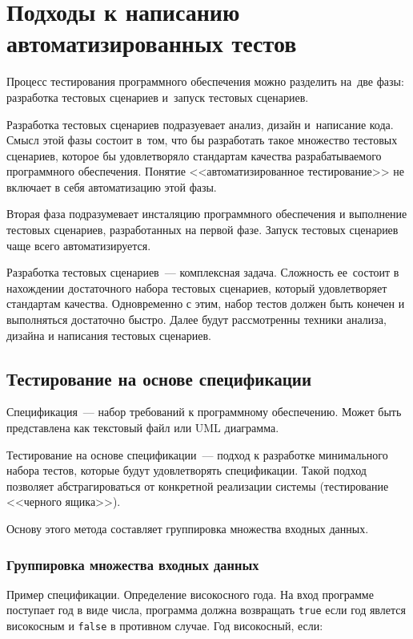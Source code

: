 \section{Подходы к написанию автоматизированных тестов} 

Процесс тестирования программного обеспечения можно разделить на~две фазы: разработка тестовых сценариев и~запуск тестовых сценариев. 

Разработка тестовых сценариев подразуевает анализ, дизайн и~написание кода. Смысл этой фазы состоит в~том, что бы разработать такое множество тестовых сценариев, которое бы удовлетворяло стандартам качества разрабатываемого программного обеспечения. Понятие <<автоматизированное тестирование>> не включает в себя автоматизацию этой фазы.

Вторая фаза подразумевает инсталяцию программного обеспечения и выполнение тестовых сценариев, разработанных на первой фазе. Запуск тестовых сценариев чаще всего автоматизируется. 


Разработка тестовых сценариев~--- комплексная задача. Сложность ее~состоит в нахождении достаточного набора тестовых сценариев, который удовлетворяет стандартам качества. Одновременно с этим, набор тестов должен быть конечен и выполняться достаточно быстро. Далее будут рассмотренны техники анализа, дизайна и написания тестовых сценариев.


\subsection{Тестирование на основе спецификации} 

Спецификация~--- набор требований к программному обеспечению. Может быть представлена как текстовый файл или UML диаграмма.

Тестирование на основе спецификации~--- подход к разработке минимального набора тестов, которые будут удовлетворять спецификации. Такой подход позволяет абстрагироваться от конкретной реализации системы (тестирование <<черного ящика>>).

Основу этого метода составляет группировка множества входных данных.

 \subsubsection{Группировка множества входных данных}

Пример спецификации. Определение високосного года. На вход программе поступает год в виде числа, программа должна возвращать \texttt{true} если год явлется високосным и \texttt{false} в противном случае. Год високосный, если:

